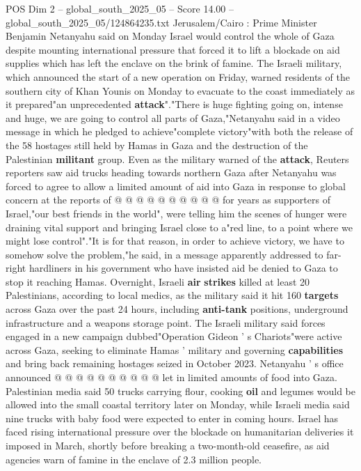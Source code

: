 \begin{textsample}{POS Dim 2 – global\_south\_2025\_05 – Score 14.00 – global\_south\_2025\_05/124864235.txt}  \label{ex:f2_pos_297}
Jerusalem/Cairo : Prime Minister Benjamin Netanyahu said on Monday Israel would control the whole of Gaza despite mounting international pressure that forced it to lift a blockade on aid supplies which has left the enclave on the brink of famine.
The Israeli military, which announced the start of a new operation on Friday, warned residents of the southern city of Khan Younis on Monday to evacuate to the coast immediately as it prepared"an unprecedented \textbf{attack}"."There is huge fighting going on, intense and huge, we are going to control all parts of Gaza,"Netanyahu said in a video message in which he pledged to achieve"complete victory"with both the release of the 58 hostages still held by Hamas in Gaza and the destruction of the Palestinian \textbf{militant} group.
Even as the military warned of the \textbf{attack}, Reuters reporters saw aid trucks heading towards northern Gaza after Netanyahu was forced to agree to allow a limited amount of aid into Gaza in response to global concern at the reports of @ @ @ @ @ @ @ @ @ @ for years as supporters of Israel,"our best friends in the world", were telling him the scenes of hunger were draining vital support and bringing Israel close to a"red line, to a point where we might lose control"."It is for that reason, in order to achieve victory, we have to somehow solve the problem,"he said, in a message apparently addressed to far-right hardliners in his government who have insisted aid be denied to Gaza to stop it reaching Hamas.
Overnight, Israeli \textbf{air} \textbf{strikes} killed at least 20 Palestinians, according to local medics, as the military said it hit 160 \textbf{targets} across Gaza over the past 24 hours, including \textbf{anti-tank} positions, underground infrastructure and a weapons storage point.
The Israeli military said forces engaged in a new campaign dubbed"Operation Gideon ' s Chariots"were active across Gaza, seeking to eliminate Hamas ' military and governing \textbf{capabilities} and bring back remaining hostages seized in October 2023.
Netanyahu ' s office announced @ @ @ @ @ @ @ @ @ @ let in limited amounts of food into Gaza.
Palestinian media said 50 trucks carrying flour, cooking \textbf{oil} and legumes would be allowed into the small coastal territory later on Monday, while Israeli media said nine trucks with baby food were expected to enter in coming hours.
Israel has faced rising international pressure over the blockade on humanitarian deliveries it imposed in March, shortly before breaking a two-month-old ceasefire, as aid agencies warn of famine in the enclave of 2.3 million people.

\end{textsample}
